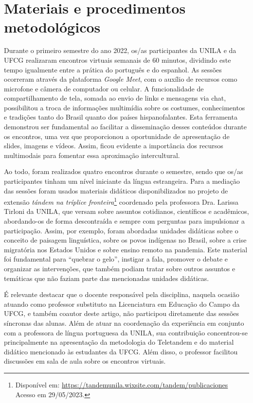 \documentclass[portuguese]{textolivre}
\begin{document}
\section{Materiais e procedimentos metodológicos}

Durante o primeiro semestre do ano 2022, os/as participantes da UNILA e da UFCG realizaram encontros virtuais semanais de 60 minutos, dividindo este tempo igualmente entre a prática do português e do espanhol. As sessões ocorreram através da plataforma \emph{Google Meet}, com o auxílio de recursos como microfone e câmera de computador ou celular. A funcionalidade de compartilhamento de tela, somada ao envio de links e mensagens via chat, possibilitou a troca de informações multimídia sobre os costumes, conhecimentos e tradições tanto do Brasil quanto dos países hispanofalantes. Esta ferramenta demonstrou ser fundamental ao facilitar a disseminação desses conteúdos durante os encontros, uma vez que proporcionou a oportunidade de apresentação de slides, imagens e vídeos. Assim, ficou evidente a importância dos recursos multimodais para fomentar essa aproximação intercultural.

Ao todo, foram realizados quatro encontros durante o semestre, sendo que os/as participantes tinham um nível iniciante da língua estrangeira. Para a mediação das sessões foram usados materiais didáticos disponibilizados no projeto de extensão \emph{tándem na tríplice fronteira}\footnote{Disponível em: \url{https://tandemunila.wixsite.com/tandem/publicaciones} Acesso em 29/05/2023.} coordenado pela professora Dra. Larissa Tirloni da UNILA, que versam sobre assuntos cotidianos, científicos e acadêmicos, abordando-os de forma descontraída e sempre com perguntas para impulsionar a participação. Assim, por exemplo, foram abordadas unidades didáticas sobre o conceito de paisagem linguística, sobre os povos indígenas no Brasil, sobre a crise migratória nos Estados Unidos e sobre ensino remoto na pandemia. Este material foi fundamental para “quebrar o gelo”, instigar a fala, promover o debate e organizar as intervenções, que também podiam tratar sobre outros assuntos e temáticas que não faziam parte das mencionadas unidades didáticas. 

É relevante destacar que o docente responsável pela disciplina, naquela ocasião atuando como professor substituto na Licenciatura em Educação do Campo da UFCG, e também coautor deste artigo, não participou diretamente das sessões síncronas das alunas. Além de atuar na coordenação da experiência em conjunto com a professora de língua portuguesa da UNILA, sua contribuição concentrou-se principalmente na apresentação da metodologia do Teletandem e do material didático mencionado às estudantes da UFCG. Além disso, o professor facilitou discussões em sala de aula sobre os encontros virtuais. 
\end{document}
